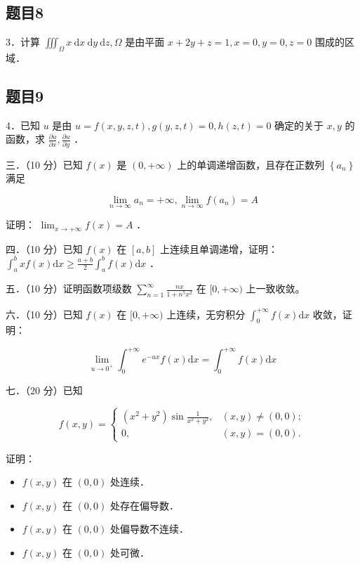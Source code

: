 \documentclass{article}
\begin{document}
\subsection{题目8}
3．计算 \(\iiint_{\Omega} x \mathrm{~d} x \mathrm{~d} y \mathrm{~d} z, \Omega\) 是由平面 \(x+2 y+z=1, x=0, y=0, z=0\) 围成的区域．

\subsection{题目9}
4．已知 \(u\) 是由 \(u=f(x, y, z, t), g(y, z, t)=0, h(z, t)=0\) 确定的关于 \(x, y\) 的函数，求 \(\frac{\partial u}{\partial x}, \frac{\partial u}{\partial y}\) ．

三．（10 分）已知 \(f(x)\) 是 \((0,+\infty)\) 上的单调递增函数，且存在正数列 \(\left\{a_{n}\right\}\) 满足

\[
\lim _{n \rightarrow \infty} a_{n}=+\infty, \lim _{n \rightarrow \infty} f\left(a_{n}\right)=A
\]

证明： \(\lim _{x \rightarrow+\infty} f(x)=A\) ．

四．（10 分）已知 \(f(x)\) 在 \([a, b]\) 上连续且单调递增，证明： \(\int_{a}^{b} x f(x) \mathrm{d} x \geq \frac{a+b}{2} \int_{a}^{b} f(x) \mathrm{d} x\) ．

五．（10 分）证明函数项级数 \(\sum_{n=1}^{\infty} \frac{n x}{1+n^{5} x^{2}}\) 在 \([0,+\infty)\) 上一致收敛。

六．（10 分）已知 \(f(x)\) 在 \([0,+\infty)\) 上连续，无穷积分 \(\int_{0}^{+\infty} f(x) \mathrm{d} x\) 收敛，证明：

\[
\lim _{u \rightarrow 0^{+}} \int_{0}^{+\infty} e^{-u x} f(x) \mathrm{d} x=\int_{0}^{+\infty} f(x) \mathrm{d} x
\]

七．（20 分）已知

\[
f(x, y)= \begin{cases}\left(x^{2}+y^{2}\right) \sin \frac{1}{x^{2}+y^{2}}, & (x, y) \neq(0,0) ; \\ 0, & (x, y)=(0,0) .\end{cases}
\]

证明：

\begin{itemize}
  \item[（1）] \(f(x, y)\) 在 \((0,0)\) 处连续．
  \item[（2）] \(f(x, y)\) 在 \((0,0)\) 处存在偏导数．
  \item[（3）] \(f(x, y)\) 在 \((0,0)\) 处偏导数不连续．
  \item[（4）] \(f(x, y)\) 在 \((0,0)\) 处可微．
\end{itemize}
\end{document}
